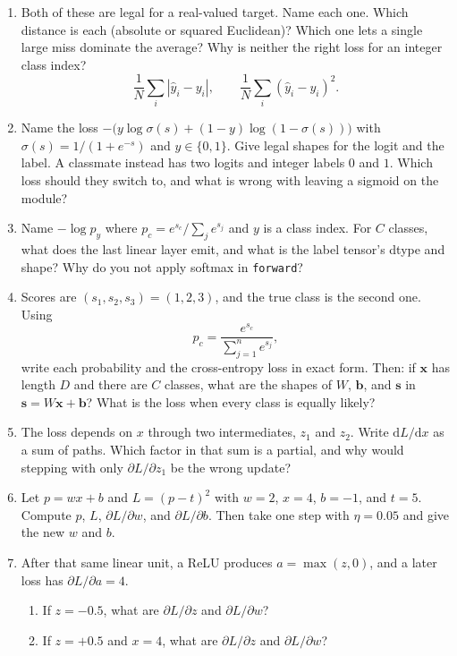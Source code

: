 \documentclass[11pt]{article}
\begin{document}
\begin{enumerate}
\item Both of these are legal for a real-valued target. Name each one. Which distance is each (absolute or squared Euclidean)? Which one lets a single large miss dominate the average? Why is neither the right loss for an integer class index?
\[
\frac{1}{N}\sum_i|\hat y_i-y_i|,
\qquad
\frac{1}{N}\sum_i(\hat y_i-y_i)^2.
\]

\item Name the loss $-\big(y\log\sigma(s)+(1-y)\log(1-\sigma(s))\big)$ with $\sigma(s)=1/(1+e^{-s})$ and $y\in\{0,1\}$. Give legal shapes for the logit and the label. A classmate instead has two logits and integer labels $0$ and $1$. Which loss should they switch to, and what is wrong with leaving a sigmoid on the module?

\item Name $-\log p_y$ where $p_c=e^{s_c}/\sum_j e^{s_j}$ and $y$ is a class index. For $C$ classes, what does the last linear layer emit, and what is the label tensor's dtype and shape? Why do you not apply softmax in \texttt{forward}?

\item Scores are $(s_1,s_2,s_3)=(1,2,3)$, and the true class is the second one. Using
\[
p_c=\frac{e^{s_c}}{\sum_{j=1}^{n}e^{s_j}},
\]
write each probability and the cross-entropy loss in exact form. Then: if $\mathbf{x}$ has length $D$ and there are $C$ classes, what are the shapes of $W$, $\mathbf{b}$, and $\mathbf{s}$ in $\mathbf{s}=W\mathbf{x}+\mathbf{b}$? What is the loss when every class is equally likely?

\item The loss depends on $x$ through two intermediates, $z_1$ and $z_2$. Write $\mathrm{d}L/\mathrm{d}x$ as a sum of paths. Which factor in that sum is a partial, and why would stepping with only $\partial L/\partial z_1$ be the wrong update?

\item Let $p=wx+b$ and $L=(p-t)^2$ with $w=2$, $x=4$, $b=-1$, and $t=5$. Compute $p$, $L$, $\partial L/\partial w$, and $\partial L/\partial b$. Then take one step with $\eta=0.05$ and give the new $w$ and $b$.

\item After that same linear unit, a ReLU produces $a=\max(z,0)$, and a later loss has $\partial L/\partial a=4$.
\begin{enumerate}
\item If $z=-0.5$, what are $\partial L/\partial z$ and $\partial L/\partial w$?
\item If $z=+0.5$ and $x=4$, what are $\partial L/\partial z$ and $\partial L/\partial w$?
\end{enumerate}


\end{enumerate}
\end{document}
